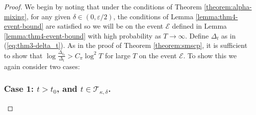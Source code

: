\begin{proof}

We begin by noting that under the conditions of Theorem \ref{theorem:alpha-mixing}, for any given $\delta \in (0,\varepsilon/2)$, the conditions of Lemma \ref{lemma:thm4-event-bound} are satisfied so we will be on the event $\mathcal{E}$ defined in Lemma \ref{lemma:thm4-event-bound} with high probability as $T \to \infty$. Define $\Delta_t$ as in (\ref{eq:thm3-delta_t}). As in the proof of Theorem \ref{theorem:smscp}, it is sufficient to show that $\log \frac{\Delta_{t_0}}{\Delta_t} > C_\pi \log^2 T$ for large $T$ on the event $\mathcal{E}$. To show this we again consider two cases:

\subsubsection*{Case 1: $t > t_0$, and $t \in \mathcal{T}_{\kappa,\delta}$.}


\end{proof}
